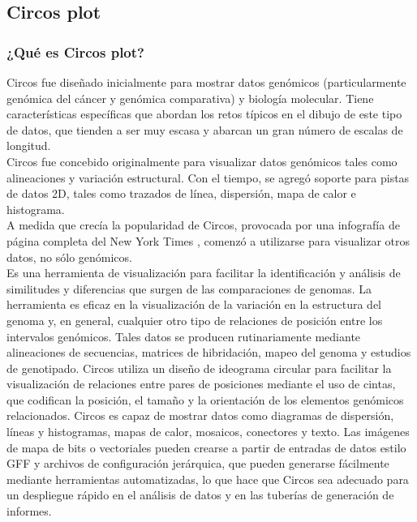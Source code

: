 \documentclass[12pt,letterpaper]{article}
\begin{document}
\subsection{Circos plot}
\subsubsection{¿Qué es Circos plot?}
Circos fue diseñado inicialmente para mostrar datos genómicos (particularmente genómica del cáncer y genómica comparativa) y biología molecular. Tiene características específicas que abordan los retos típicos en el dibujo de este tipo de datos, que tienden a ser muy escasa y abarcan un gran número de escalas de longitud.\\

Circos fue concebido originalmente para visualizar datos gen\'{o}micos tales como alineaciones y variaci\'{o}n estructural. Con el tiempo, se agreg\'{o} soporte para pistas de datos 2D, tales como trazados de l\'{i}nea, dispersi\'{o}n, mapa de calor e histograma.\\

A medida que crecía la popularidad de Circos, provocada por una infografía de página completa del New York Times , comenzó a utilizarse para visualizar otros datos, no sólo genómicos.\\

Es una herramienta de visualización para facilitar la identificación y análisis de similitudes y diferencias que surgen de las comparaciones de genomas. La herramienta es eficaz en la visualización de la variación en la estructura del genoma y, en general, cualquier otro tipo de relaciones de posición entre los intervalos genómicos. Tales datos se producen rutinariamente mediante alineaciones de secuencias, matrices de hibridación, mapeo del genoma y estudios de genotipado. Circos utiliza un diseño de ideograma circular para facilitar la visualización de relaciones entre pares de posiciones mediante el uso de cintas, que codifican la posición, el tamaño y la orientación de los elementos genómicos relacionados. Circos es capaz de mostrar datos como diagramas de dispersión, líneas y histogramas, mapas de calor, mosaicos, conectores y texto. Las imágenes de mapa de bits o vectoriales pueden crearse a partir de entradas de datos estilo GFF y archivos de configuración jerárquica, que pueden generarse fácilmente mediante herramientas automatizadas, lo que hace que Circos sea adecuado para un despliegue rápido en el análisis de datos y en las tuberías de generación de informes.\\
\end{document}
